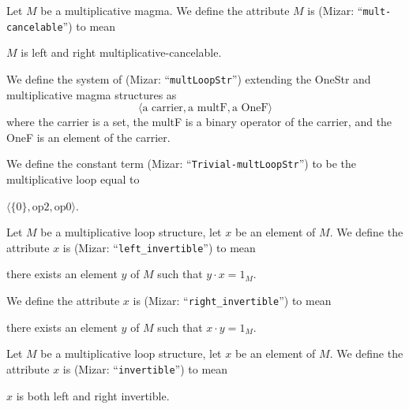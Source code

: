 \documentclass{article}
\begin{document}
\begin{definition}
Let $M$ be a multiplicative magma.
We define the attribute $M$ is  (Mizar: ``\verb#mult-cancelable#'')
to mean
\begin{defn}
\item $M$ is left and right multiplicative-cancelable.
\end{defn}
\end{definition}

\begin{definition}
We define the system of 
(Mizar: ``\verb#multLoopStr#'') extending the OneStr and multiplicative
magma structures as
\[\langle\mbox{a carrier},\mbox{a multF},\mbox{a OneF}\rangle\]
where the carrier is a set, the multF is a binary operator of the
carrier, and the OneF is an element of the carrier.
\end{definition}

\begin{definition}
We define the constant term 
(Mizar: ``\verb#Trivial-multLoopStr#'')
to be the multiplicative loop equal to
\begin{defn}
\item $\langle\{0\},\mbox{op2},\mbox{op0}\rangle$.
\end{defn}
\end{definition}

\begin{definition}
Let $M$ be a multiplicative loop structure, let $x$ be an element of $M$.
We define the attribute $x$ is 
(Mizar: ``\verb#left_invertible#'')
to mean
\begin{defn}
\item there exists an element $y$ of $M$ such that $y\cdot x=1_{M}$.
\end{defn}
We define the attribute $x$ is 
(Mizar: ``\verb#right_invertible#'')
to mean
\begin{defn}
\item there exists an element $y$ of $M$ such that $x\cdot y=1_{M}$.
\end{defn}
\end{definition}

\begin{definition}
Let $M$ be a multiplicative loop structure, let $x$ be an element of $M$.
We define the attribute $x$ is 
(Mizar: ``\verb#invertible#'')
to mean
\begin{defn}
\item $x$ is both left and right invertible.
\end{defn}
\end{definition}
\end{document}

